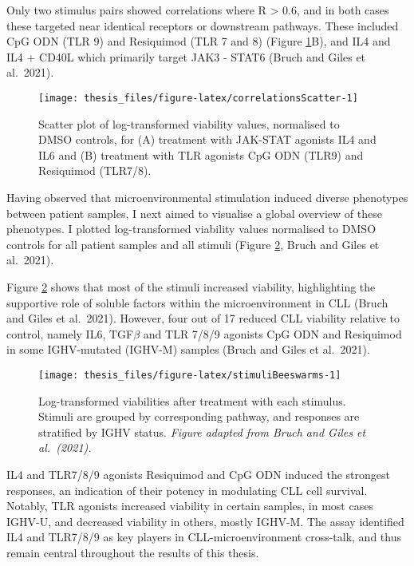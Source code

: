 \documentclass[11pt, a4paper, twosided]{book}
\begin{document}
Only two stimulus pairs showed correlations where R \textgreater{} 0.6, and in both cases these targeted near identical receptors or downstream pathways. These included CpG ODN (TLR 9) and Resiquimod (TLR 7 and 8) (Figure \ref{fig:correlationsScatter}B), and IL4 and IL4 + CD40L which primarily target JAK3 - STAT6 (Bruch and Giles et al.~2021).


\begin{figure}

{\centering \texttt{[image: thesis\_files/figure-latex/correlationsScatter-1]} 

}

\caption{Scatter plot of log-transformed viability values, normalised to DMSO controls, for (A) treatment with JAK-STAT agonists IL4 and IL6 and (B) treatment with TLR agonists CpG ODN (TLR9) and Resiquimod (TLR7/8).}\label{fig:correlationsScatter}
\end{figure}
Having observed that microenvironmental stimulation induced diverse phenotypes between patient samples, I next aimed to visualise a global overview of these phenotypes. I plotted log-transformed viability values normalised to DMSO controls for all patient samples and all stimuli (Figure \ref{fig:stimuliBeeswarms}, Bruch and Giles et al.~2021).

Figure \ref{fig:stimuliBeeswarms} shows that most of the stimuli increased viability, highlighting the supportive role of soluble factors within the microenvironment in CLL (Bruch and Giles et al.~2021). However, four out of 17 reduced CLL viability relative to control, namely IL6, TGF\(\beta\) and TLR 7/8/9 agonists CpG ODN and Resiquimod in some IGHV-mutated (IGHV-M) samples (Bruch and Giles et al.~2021).


\begin{figure}

{\centering \texttt{[image: thesis\_files/figure-latex/stimuliBeeswarms-1]} 

}

\caption{Log-transformed viabilities after treatment with each stimulus. Stimuli are grouped by corresponding pathway, and responses are stratified by IGHV status. \emph{Figure adapted from Bruch and Giles et al.~(2021).}}\label{fig:stimuliBeeswarms}
\end{figure}
IL4 and TLR7/8/9 agonists Resiquimod and CpG ODN induced the strongest responses, an indication of their potency in modulating CLL cell survival. Notably, TLR agonists increased viability in certain samples, in most cases IGHV-U, and decreased viability in others, mostly IGHV-M. The assay identified IL4 and TLR7/8/9 as key players in CLL-microenvironment cross-talk, and thus remain central throughout the results of this thesis.
\end{document}
